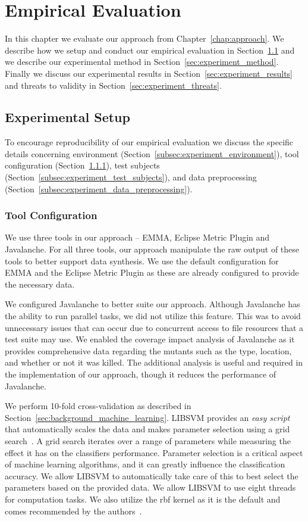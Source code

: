 \chapter{Empirical Evaluation}
\label{chap:experiment}
In this chapter we evaluate our approach from Chapter~\ref{chap:approach}. We describe how we setup and conduct our empirical evaluation in Section~\ref{sec:experiment_setup} and we describe our experimental method in Section~\ref{sec:experiment_method}. Finally we discuss our experimental results in Section~\ref{sec:experiment_results} and threats to validity in Section~\ref{sec:experiment_threats}.


\section{Experimental Setup}
\label{sec:experiment_setup}
To encourage reproducibility of our empirical evaluation we discuss the specific details concerning environment (Section~\ref{subsec:experiment_environment}), tool configuration (Section~\ref{subsec:experiment_tool_configuration}), test subjects (Section~\ref{subsec:experiment_test_subjects}), and data preprocessing (Section~\ref{subsec:experiment_data_preprocessing}).


\subsection{Tool Configuration}
\label{subsec:experiment_tool_configuration}
We use three tools in our approach -- EMMA, Eclipse Metric Plugin and Javalanche. For all three tools, our approach manipulate the raw output of these tools to better support data synthesis. We use the default configuration for EMMA and the Eclipse Metric Plugin as these are already configured to provide the necessary data.

We configured Javalanche to better suite our approach. Although Javalanche has the ability to run parallel tasks, we did not utilize this feature. This was to avoid unnecessary issues that can occur due to concurrent access to file resources that a test suite may use. We enabled the coverage impact analysis of Javalanche as it provides comprehensive data regarding the mutants such as the type, location, and whether or not it was killed. The additional analysis is useful and required in the implementation of our approach, though it reduces the performance of Javalanche.

We perform 10-fold cross-validation as described in Section~\ref{sec:background_machine_learning}. LIBSVM provides an \emph{easy script} that automatically scales the data and makes parameter selection using a grid search~\cite{HCL03}. A grid search iterates over a range of parameters while measuring the effect it has on the classifiers performance. Parameter selection is a critical aspect of machine learning algorithms, and it can greatly influence the classification accuracy. We allow LIBSVM to automatically take care of this to best select the parameters based on the provided data. We allow LIBSVM to use eight threads for computation tasks. We also utilize the \gls{rbf} kernel as it is the default and comes recommended by the authors~\cite{HCL03}.

